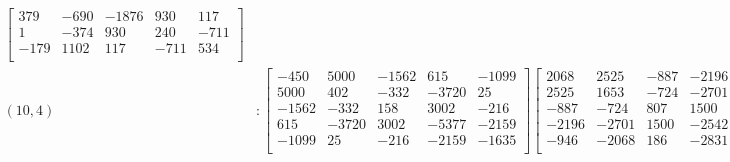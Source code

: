 \documentclass[12pt]{amsart}
\theoremstyle{plain}
\theoremstyle{definition}
\begin{document}
\begin{landscape}
\begin{align*}
\begin{bmatrix}
 379  &   -690  &   -1876  &   930  &   117  \\ 
 1  &   -374  &   930  &   240  &   -711  \\ 
 -179  &   1102  &   117  &   -711  &   534  \\ 
\end{bmatrix}
\\
(10,4) &:
\begin{bmatrix}
-450  &   5000  &   -1562  &   615  &   -1099  \\ 
 5000  &   402  &   -332  &   -3720  &   25  \\ 
 -1562  &   -332  &   158  &   3002  &   -216  \\ 
 615  &   -3720  &   3002  &   -5377  &   -2159  \\ 
 -1099  &   25  &   -216  &   -2159  &   -1635  \\ 
\end{bmatrix}
\begin{bmatrix}
2068  &   2525  &   -887  &   -2196  &   -946  \\ 
 2525  &   1653  &   -724  &   -2701  &   -2068  \\ 
 -887  &   -724  &   807  &   1500  &   186  \\ 
 -2196  &   -2701  &   1500  &   -2542  &   -2831  \\ 
 -946  &   -2068  &   186  &   -2831  &   -2885  \\ 
\end{bmatrix}
\begin{bmatrix}
2196  &   2357  &   -819  &   -2284  &   -417  \\ 
 2357  &   2203  &   -1076  &   -3197  &   -754  \\ 
 -819  &   -1076  &   858  &   1413  &   -377  \\ 
 -2284  &   -3197  &   1413  &   -3254  &   -2172  \\ 
 -417  &   -754  &   -377  &   -2172  &   -2025  \\ 
\end{bmatrix}
\begin{bmatrix}
-2545  &   -2768  &   836  &   1938  &   448  \\ 
 -2768  &   -2984  &   751  &   2447  &   787  \\ 
 836  &   751  &   -1404  &   -1646  &   66  \\ 
 1938  &   2447  &   -1646  &   2364  &   2512  \\ 
 448  &   787  &   66  &   2512  &   1376  \\ 
\end{bmatrix}
\\
\end{align*} 
\end{landscape}
\end{document}
